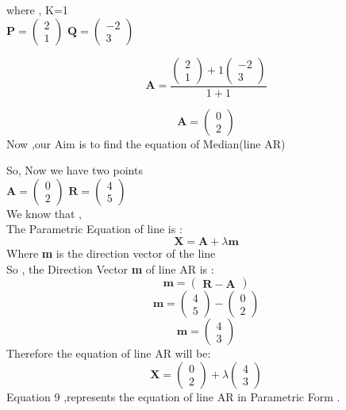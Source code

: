 \documentclass[journal,12pt,twocolumn]{IEEEtran}
\newcommand{\myvec}[1]{\ensuremath{\begin{pmatrix}#1\end{pmatrix}}}
\let\vec\mathbf
\begin{document}
  where , K=1 \\ 
  \linebreak
$\vec{P} = \myvec{2 \\ 1}$ \hspace{5mm}
$\vec{Q} = \myvec{-2 \\ 3}$ \hspace{5mm}

\begin{equation}
\vec{A} = \frac{{\myvec{2\\1}}  + 1{\myvec{-2\\3}}}{1+1}
\end{equation}                         

\begin{equation}
\vec{A} = {\myvec{0\\2}}
\end{equation} 
Now ,our Aim is to find the equation of Median(line AR)

So, Now we have two points \\
\linebreak
$\vec{A} = \myvec{0 \\ 2}$ \hspace{5mm}
$\vec{R} = \myvec{4 \\ 5}$ \\
\linebreak
We know that ,\\
The Parametric Equation of line is :\\
\begin{equation}
\vec{X} = \vec{A}+\lambda\vec{m}
\end{equation}
Where \textbf{m} is the direction vector of the line\\
\linebreak
So , the Direction Vector \textbf{m} of line AR is :
\begin{equation}
\vec{m} = \myvec{{\vec{R} - \vec{A}}}
\end{equation}
\begin{equation}
\vec{m} = \myvec{4 \\ 5} -\myvec{0 \\ 2}
\end{equation}
\begin{equation}
\vec{m} = \myvec{4 \\ 3}
\end{equation}
Therefore the equation of line AR will be:
\begin{equation}
\vec{X} = \myvec{0 \\ 2}+\lambda\myvec{ 4 \\ 3}
\end{equation}
Equation 9 ,represents the equation of line AR in Parametric Form . 
\end{document}
